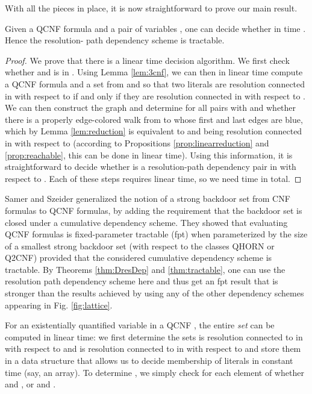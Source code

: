 \documentclass{llncs}
\def\hy{\hbox{-}\nobreak\hskip0pt} \newcommand{\ellipsis}{}
\begin{document}
With all the pieces in place, it is now straightforward to prove our main result.
\begin{theorem} \label{thm:tractable} Given a QCNF formula  and a pair
  of variables , one can decide whether  in time . Hence the resolution\hy
  path dependency scheme is tractable.
\end{theorem}
\begin{proof}
  We prove that there is a linear time decision algorithm. We first check
  whether  and  is in . Using
  Lemma \ref{lem:3cnf}, we can then in linear time compute a QCNF formula
   and a set  from  and  so that two literals are resolution
  connected in  with respect to  if and only if they are resolution
  connected in  with respect to . We can then construct the graph
   and determine for all pairs  with  and  whether there is a properly
  edge\hy colored walk from  to  whose first and last edges
  are blue, which by Lemma \ref{lem:reduction} is equivalent to  and
   being resolution connected in  with respect to 
  (according to Propositions \ref{prop:linearreduction} and
  \ref{prop:reachable}, this can be done in linear time). Using this
  information, it is straightforward to decide whether  is a
  resolution\hy path dependency pair in  with respect to . Each of these steps requires
  linear time, so we need  time in total.
\end{proof}

Samer and Szeider \cite{SamerSzeider09a} generalized the notion of a strong
backdoor set from CNF formulas to QCNF formulas, by adding the requirement
that the backdoor set is closed under a cumulative dependency scheme. They
showed that evaluating QCNF formulas is fixed-parameter tractable (fpt) when
parameterized by the size of a smallest strong backdoor set (with respect to
the classes QHORN or Q2CNF) provided that the considered cumulative dependency
scheme is tractable. By Theorems \ref{thm:DresDep} and \ref{thm:tractable},
one can use the resolution path dependency scheme here and thus get an fpt
result that is stronger than the results achieved by using any of the other
dependency schemes appearing in Fig. \ref{fig:lattice}.


For an existentially quantified variable  in a QCNF , the entire
\emph{set}  can be computed in linear time: we first
determine the sets  is resolution connected
to  in  with respect to  and 
is resolution connected to  in  with respect to  and store them in a data structure that
allows us to decide membership of literals in constant time (say, an
array). To determine , we simply check for each element 
of  whether  and , or  and .
\end{document}

